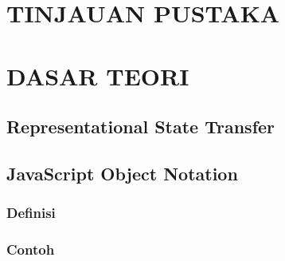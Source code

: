 \documentclass[ugmskripsi]{ugmskripsi}
\begin{document}


\chapter{TINJAUAN PUSTAKA}
\label{TINJAUAN PUSTAKA}




\chapter{DASAR TEORI}
\label{DASAR TEORI}

	\section{Representational State Transfer}
	\label{dasar teori rest}
	

	\section{JavaScript Object Notation}
	\label{dasar teori json}

		\subsection{Definisi}
		\label{dasar teori definisi json}
		

		\subsection{Contoh}
		\label{dasar teori contoh json}
		



\end{document}
